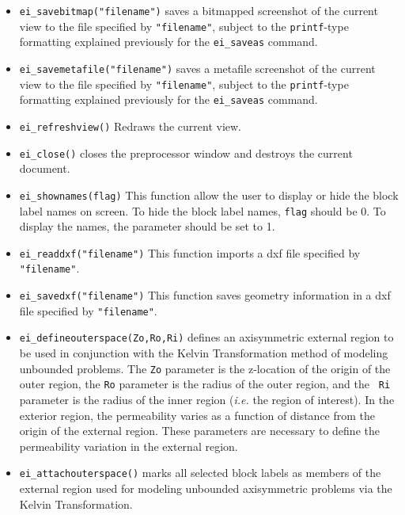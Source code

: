 \begin{itemize}
\item \texttt{ei\_savebitmap("filename")} saves a bitmapped screenshot of the current
view to the file specified by \texttt{"filename"}, subject to the
\texttt{printf}-type formatting explained previously for the
\texttt{ei\_saveas} command.

\item \texttt{ei\_savemetafile("filename")} saves a metafile screenshot of the current
view to the file specified by \texttt{"filename"}, subject to the
\texttt{printf}-type formatting explained previously for the
\texttt{ei\_saveas} command.

\item \texttt{ei\_refreshview()} Redraws the current view.

\item \texttt{ei\_close()} closes the preprocessor window and
destroys the current document.

\item \texttt{ei\_shownames(flag)} This function allow the user to display or hide the
block label names on screen. To hide the block label names,
\texttt{flag} should be 0. To display the names, the parameter
should be set to 1.

\item{\tt ei\_readdxf("filename")} This function imports a dxf file specified by {\tt "filename"}.

\item{\tt ei\_savedxf("filename")} This function saves geometry information in a dxf file specified by {\tt "filename"}.

\item{\tt ei\_defineouterspace(Zo,Ro,Ri)} defines
an axisymmetric external region to be used in conjunction with the
Kelvin Transformation method of modeling unbounded problems.  The
{\tt Zo} parameter is the z-location of the origin of the outer region,
the {\tt Ro} parameter is the radius of the outer region, and the {\tt
Ri} parameter is the radius of the inner region ({\em i.e.} the region of
interest). In the exterior region, the permeability varies as a function of
distance from the origin of the external region.  These parameters
are necessary to define the permeability variation in the external
region.

\item{\tt ei\_attachouterspace()} marks all
selected block labels as members of the external region used for
modeling unbounded axisymmetric problems via the Kelvin
Transformation.


\end{itemize}

